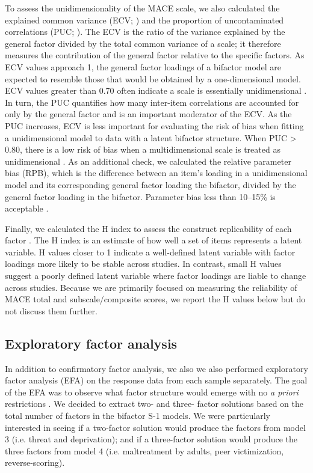 \documentclass[letterpaper,man,natbib,floatsintext,longtable]{apa6}
\begin{document}
To assess the unidimensionality of the MACE scale, we also calculated the explained common variance (ECV; \citealt{sijtsma2009use}) and the proportion of uncontaminated correlations (PUC; \citealt{reise2013multidimensionality}). The ECV is the ratio of the variance explained by the general factor divided by the total common variance of a scale; it therefore measures the contribution of the general factor relative to the specific factors. As ECV values approach 1, the general factor loadings of a bifactor model are expected to resemble those that would be obtained by a one-dimensional model. ECV values greater than 0.70 often indicate a scale is essentially unidimensional \citep{rodriguez2016applying}. In turn, the PUC quantifies how many inter-item correlations are accounted for only by the general factor and is an important moderator of the ECV. As the PUC increases, ECV is less important for evaluating the risk of bias when fitting a unidimensional model to data with a latent bifactor structure. When PUC > 0.80, there is a low risk of bias when a multidimensional scale is treated as unidimensional \citep{reise2013multidimensionality}. As an additional check, we calculated the relative parameter bias (RPB), which is the difference between an item's loading in a unidimensional model and its corresponding general factor loading the bifactor, divided by the general factor loading in the bifactor. Parameter bias less than 10–15\% is acceptable \citep{muthen1987structural}.

Finally, we calculated the H index to assess the construct replicability of each factor \citep{hancock2001rethinking}. The H index is an estimate of how well a set of items represents a latent variable. H values closer to 1 indicate a well-defined latent variable with factor loadings more likely to be stable across studies. In contrast, small H values suggest a poorly defined latent variable where factor loadings are liable to change across studies. Because we are primarily focused on measuring the reliability of MACE total and subscale/composite scores, we report the H values below but do not discuss them further.

\subsection{Exploratory factor analysis}

In addition to confirmatory factor analysis, we also we also performed exploratory factor analysis (EFA) on the response data from each sample separately. The goal of the EFA was to observe what factor structure would emerge with no \emph{a priori} restrictions \citep{schmitt2018selecting}. We decided to extract two- and three- factor solutions based on the total number of factors in the bifactor S-1 models. We were particularly interested in seeing if a two-factor solution would produce the factors from model 3 (i.e. threat and deprivation); and if a three-factor solution would produce the three factors from model 4 (i.e. maltreatment by adults, peer victimization, reverse-scoring). 
\end{document}
